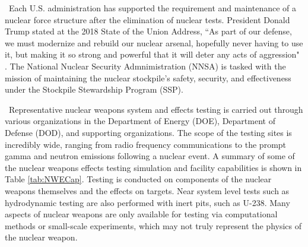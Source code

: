 \ Each U.S. administration has supported the requirement and maintenance of a nuclear force structure after the elimination of nuclear tests. President Donald Trump stated at the 2018 State of the Union Address, ``As part of our defense, we must modernize and rebuild our nuclear arsenal, hopefully never having to use it, but making it so strong and powerful that it will deter any acts of aggression" \cite{Trump2018}. The National Nuclear Security Admnimistration (NNSA) is tasked with the mission of maintaining the nuclear stockpile's safety, security, and effectiveness under the Stockpile Stewardship Program (SSP).  

\ Representative nuclear weapons system and effects testing is carried out through various organizations in the Department of Energy (DOE), Department of Defense (DOD), and supporting organizations. The scope of the testing sites is incredibly wide, ranging from radio frequency communications to the prompt gamma and neutron emissions following a nuclear event. A summary of some of the nuclear weapons effects testing simulation and facility capabilities is shown in Table \ref{tab:NWECap}. Testing is conducted on components of the nuclear weapons themselves and the effects on targets. Near system level tests such as hydrodynamic testing are also performed with inert pits, such as U-238\cite{martz2014without}. Many aspects of nuclear weapons are only available for testing via computational methods or small-scale experiments, which may not truly represent the physics of the nuclear weapon. 

